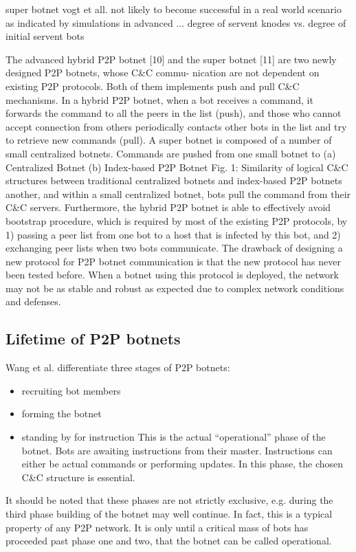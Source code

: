 \documentclass{llncs}
\begin{document}
super botnet vogt et all. not likely to become successful in a real world scenario as indicated by simulations in advanced ... degree of servent knodes vs. degree of initial servent bots


The advanced hybrid P2P botnet [10] and the super botnet [11] are two
newly designed P2P botnets, whose C\&C commu- nication are not
dependent on existing P2P protocols. Both of them implements push and
pull C\&C mechanisms. In a hybrid P2P botnet, when a bot receives a
command, it forwards the command to all the peers in the list (push),
and those who cannot accept connection from others periodically
contacts other bots in the list and try to retrieve new commands
(pull).  A super botnet is composed of a number of small centralized
botnets. Commands are pushed from one small botnet to (a) Centralized
Botnet (b) Index-based P2P Botnet Fig. 1: Similarity of logical C\&C
structures between traditional centralized botnets and index-based P2P
botnets another, and within a small centralized botnet, bots pull the
command from their C\&C servers. Furthermore, the hybrid P2P botnet is
able to effectively avoid bootstrap procedure, which is required by
most of the existing P2P protocols, by 1) passing a peer list from one
bot to a host that is infected by this bot, and 2) exchanging peer
lists when two bots communicate.  The drawback of designing a new
protocol for P2P botnet communication is that the new protocol has
never been tested before. When a botnet using this protocol is
deployed, the network may not be as stable and robust as expected due
to complex network conditions and defenses.

\cite{wang2009systematic}

\subsection{Lifetime of P2P botnets}
Wang et al.\cite{wang2009systematic} differentiate three stages of P2P botnets:
\begin{itemize}
\item recruiting bot members
\item forming the botnet
\item standing by for instruction
This is the actual ``operational'' phase of the botnet. Bots are awaiting instructions from their master. Instructions can either be actual commands or performing updates. In this phase, the chosen C\&C structure is essential.
\end{itemize}
It should be noted that these phases are not strictly exclusive,
e.g. during the third phase building of the botnet may well
continue. In fact, this is a typical property of any P2P network. It
is only until a critical mass of bots has proceeded past phase one and
two, that the botnet can be called operational.
\end{document}
